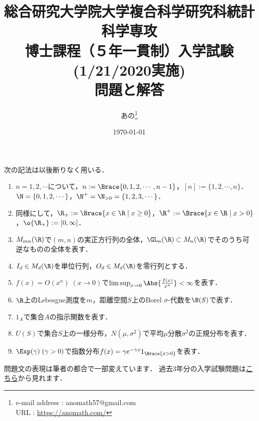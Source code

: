 \documentclass[uplatex,dvipdfmx]{jsarticle}
\title{総合研究大学院大学複合科学研究科統計科学専攻\\
博士課程（５年一貫制）入学試験(1/21/2020実施)\\
問題と解答}
\author{あの\footnote{e-mail address : anomath57@gmail.com\\URL : \url{https://anomath.com/}}}
\date{\today}
\begin{document}
\maketitle

\begin{tcolorbox}[title=記法についての注意]
    次の記法は以後断りなく用いる．
    \begin{enumerate}
        \item $n=1,2,\cdots$について，$n:=\Brace{0,1,2,\cdots,n-1}$，$[n]:=\{1,2,\cdots,n\}$．$\N=\{0,1,2,\cdots\}$，$\N^+=\N_{>0}=\{1,2,3,\cdots\}$．
        \item 同様にして，$\R_+:=\Brace{x\in\R\mid x\ge0}$，$\R^+:=\Brace{x\in\R\mid x>0}$，$\o{\R_+}:=[0,\infty]$．
        \item $M_{mn}(\R)$で$(m,n)$の実正方行列の全体，$\GL_n(\R)\subset M_n(\R)$でそのうち可逆なものの全体を表す．
        \item $I_d\in M_d(\R)$を単位行列，$O_d\in M_d(\R)$を零行列とする．
        \item $f(x)=O(x^n)\;(x\to0)$で$\limsup_{x\to0}\Abs{\frac{f(x)}{x^n}}<\infty$を表す．
        \item $\R$上のLebesgue測度を$m$，距離空間$S$上のBorel $\sigma$-代数を$\B(S)$で表す．
        \item $1_A$で集合$A$の指示関数を表す．
        \item $U(S)$で集合$S$上の一様分布，$N(\mu,\sigma^2)$で平均$\mu$分散$\sigma^2$の正規分布を表す．
        \item $\Exp(\gamma)\;(\gamma>0)$で指数分布$f(x)=\gamma e^{-\gamma x}1_{\Brace{x>0}}$を表す．
    \end{enumerate}
    問題文の表現は筆者の都合で一部変えています．
    過去3年分の入学試験問題は\href{https://www.ism.ac.jp/senkou/admission/kakomon.html}{こちら}から見れます．
\end{tcolorbox}
\end{document}
